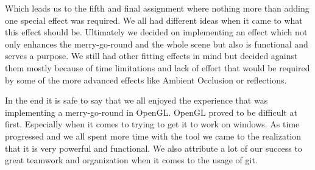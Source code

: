 \documentclass{report}
\begin{document}
\par
Which leads us to the fifth and final assignment where nothing more than adding one special effect was required. We all had different ideas when it came to what this effect should be. Ultimately we decided on implementing an effect which not only enhances the merry-go-round and the whole scene but also is functional and serves a purpose. We still had other fitting effects in mind but decided against them mostly because of time limitations and lack of effort that would be required by some of the more advanced effects like Ambient Occlusion or reflections. 
\par
In the end it is safe to say that we all enjoyed the experience that was implementing a merry-go-round in OpenGL. OpenGL proved to be difficult at first. Especially when it comes to trying to get it to work on windows. As time progressed and we all spent more time with the tool we came to the realization that it is very powerful and functional. We also attribute a lot of our success to great teamwork and organization when it comes to the usage of git.  
\end{document}
